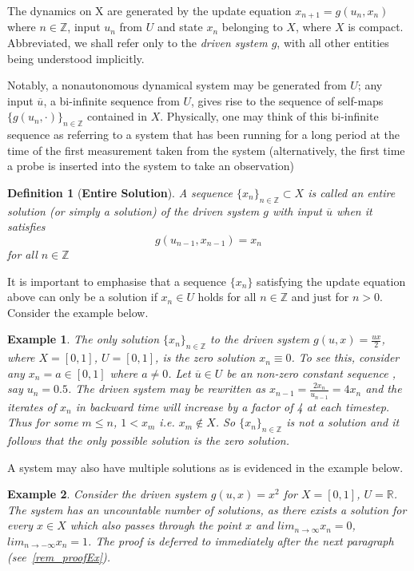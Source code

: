 \documentclass[a4paper,12pt,twoside]{report}
\newtheorem{Definition}{Definition}[]
\newtheorem{Example}{Example}[]
\begin{document}
The dynamics on X are generated by the update equation $x_{n+1}=g(u_n, x_n)$ where $n\in\mathbb{Z}$, input $u_n$ from $U$ and state $x_n$ belonging to $X$, where $X$ is compact.
Abbreviated, we shall refer only to the \emph{driven system $g$}, with all other entities being understood implicitly.

Notably, a nonautonomous dynamical system may be generated from $U$; any input $\overline{u}$, a bi-infinite sequence from $U$, gives rise to the sequence of self-maps $\{g(u_n, \cdot)\}_{n\in\mathbb{Z}}$ contained in $X$.
Physically, one may think of this bi-infinite sequence as referring to a system that has been running for a long period at the time of the first measurement taken from the system (alternatively, the first time a probe is inserted into the system to take an observation)

\begin{Definition}
  [\bf Entire Solution] \label{Dfn_Soln} \rm
  A sequence $\{x_n\}_{n\in\mathbb{Z}}\subset X$ is called an entire solution (or simply a solution) of the driven system  $g$ with input $\overline{u}$ when it satisfies 
  \[g(u_{n-1}, x_{n-1})=x_n\] for all $n\in\mathbb{Z}$
\end{Definition}

It is important to emphasise that a sequence $\{x_n\}$ satisfying the update equation above can only be a solution if $x_n\in{U}$ holds for all $n\in\mathbb{Z}$ and just for $n>0$. Consider the example below.

\begin{Example} \rm \label{ex_halfux}
  The only solution  $\{x_n\}_{n\in\mathbb{Z}}$ to the driven system  $g(u,x)=\frac{ux}{2}$, where $X=[0,1]$, $U=[0,1]$,  is the zero solution $x_n\equiv0$.
  To see this, consider any $x_n=a\in[0,1]$ where $a\neq{0}$.  Let $\overline{u}\in{U}$ be an non-zero constant sequence , say $u_n=0.5$. 
  The driven system may be rewritten as $x_{n-1}=\frac{2x_n}{u_{n-1}}=4x_n$ and the  iterates of $x_n$ in backward time will increase by a factor of 4 at each timestep. 
  Thus for some $m\leq{n}$,  $1<x_m$ i.e. $x_m\notin{X}$. So ${\{x_n\}}_{n\in\mathbb{Z}}$ is not a solution and it follows that the only possible solution is the zero solution.
\end{Example}


A system may also have multiple solutions as is evidenced in the example below.

\begin{Example}\label{Ex_exp} \rm 
  Consider the driven system $g(u,x)=x^2$ for $X=[0,1]$, $U=\mathbb{R}$. The system has an uncountable number of solutions, as there exists a solution for every $x\in{X}$ which also passes through the point $x$ and $lim_{n\to\infty}x_n=0$, $lim_{n\to{-}\infty}x_n=1$.  
 The proof is deferred to immediately after the next paragraph (see~\ref{rem_proofEx}).
\end{Example}
\end{document}
